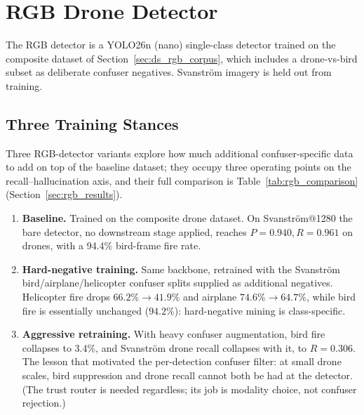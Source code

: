
\section{RGB Drone Detector}
\label{sec:rgb_detector}

The RGB detector is a YOLO26n (nano) single-class detector trained on the composite dataset of Section~\ref{sec:ds_rgb_corpus}, which includes a drone-vs-bird subset as deliberate confuser negatives. Svanstr\"om imagery is held out from training.

\subsection{Three Training Stances}
\label{sec:rgb_three_variants}

Three RGB-detector variants explore how much additional confuser-specific data to add on top of the baseline dataset; they occupy three operating points on the recall--hallucination axis, and their full comparison is Table~\ref{tab:rgb_comparison} (Section~\ref{sec:rgb_results}).

\begin{enumerate}
    \item \textbf{Baseline.} Trained on the composite drone dataset. On Svanstr\"om@1280 the bare detector, no downstream stage applied, reaches $P=0.940, R=0.961$ on drones, with a 94.4\% bird-frame fire rate.
    \item \textbf{Hard-negative training.} Same backbone, retrained with the Svanstr\"om bird/\allowbreak airplane/\allowbreak helicopter confuser splits supplied as additional negatives. Helicopter fire drops $66.2\% \to 41.9\%$ and airplane $74.6\% \to 64.7\%$, while bird fire is essentially unchanged ($94.2\%$): hard-negative mining is class-specific.
    \item \textbf{Aggressive retraining.} With heavy confuser augmentation, bird fire collapses to 3.4\%, and Svanstr\"om drone recall collapses with it, to $R=0.306$. The lesson that motivated the per-detection confuser filter: at small drone scales, bird suppression and drone recall cannot both be had at the detector. (The trust router is needed regardless; its job is modality choice, not confuser rejection.)
\end{enumerate}

